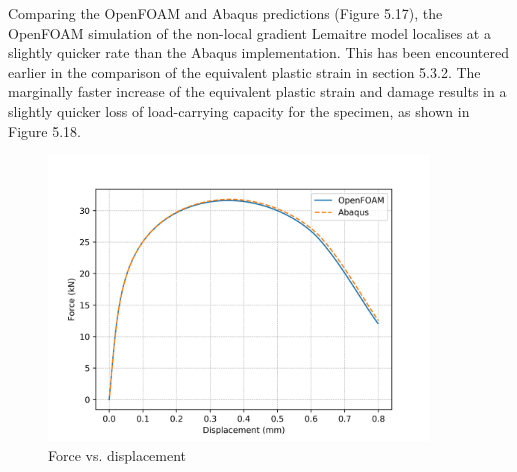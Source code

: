 \documentclass[sn-mathphys,Numbered,draft]{sn-jnl}%
\begin{document}

Comparing the OpenFOAM and Abaqus predictions (Figure 5.17), the OpenFOAM simulation of the non-local gradient Lemaitre model localises at a slightly quicker rate than the Abaqus implementation. This has been encountered earlier in the comparison of the equivalent plastic strain in section 5.3.2. The marginally faster increase of the equivalent plastic strain and damage results in a slightly quicker loss of load-carrying capacity for the specimen, as shown in Figure 5.18.

\begin{figure}[htb]
\begin{center}
	\includegraphics[width=0.9\textwidth]{./Figures/LemaitreCompare/axiCompare/1.1LemaitreCompare.png}
\caption{Force vs. displacement}
\label{fig:notchedRoundBAr}
\end{center}
\end{figure}
\end{document}
